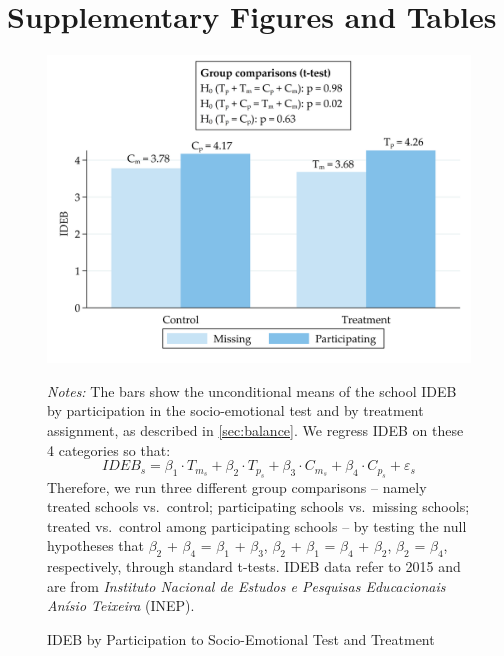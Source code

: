 \documentclass[11pt,a4paper]{article}
\begin{document}


\clearpage
\appendix
	
\section{Supplementary Figures and Tables}
\setcounter{figure}{0}
\setcounter{table}{0}
\renewcommand{\thefigure}{A\arabic{figure}}
\renewcommand{\thetable}{A\arabic{table}}
\label{app:tables_figures}

\null
\vfill
\begin{figure}[ht!]
    \caption{IDEB by Participation to Socio-Emotional Test and Treatment}
    \label{fig:predict_participation}
    \centering

    \includegraphics[width=14cm]{DataWork/Output/Figures/figA1_predict_participation.png}
    
    \noindent
    \justifying
    \small{\textit{Notes:} The bars show the unconditional means of the school IDEB by participation in the socio-emotional test and by treatment assignment, as described in \ref{sec:balance}. We regress IDEB on these 4 categories so that:
    \begin{equation*}
        IDEB_s = \beta_1 \cdot T_{m_s} + \beta_2 \cdot T_{p_s} + \beta_3 \cdot C_{m_s} + \beta_4 \cdot C_{p_s} + \varepsilon_s
    \end{equation*}
    Therefore, we run three different group comparisons -- namely treated schools vs.\ control; participating schools vs.\ missing schools; treated vs.\ control among participating schools -- by testing the null hypotheses that $\beta_2$ + $\beta_4$ = $\beta_1$ + $\beta_3$, $\beta_2$ + $\beta_1$ = $\beta_4$ + $\beta_2$, $\beta_2$ = $\beta_4$, respectively, through standard t-tests. IDEB data refer to 2015 and are from \textit{Instituto Nacional de Estudos e Pesquisas Educacionais Anísio Teixeira} (INEP).}
\end{figure}
\vfill
\end{document}
